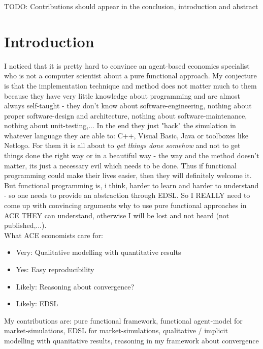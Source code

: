 \documentclass{article}
\begin{document}

TODO: Contributions should appear in the conclusion, introduction and abstract


\section{Introduction}

I noticed that it is pretty hard to convince an agent-based economics specialist who is not a computer scientist about a pure functional approach. My conjecture is that the implementation technique and method does not matter much to them because they have very little knowledge about programming and are almost always self-taught - they don't know about software-engineering, nothing about proper software-design and architecture, nothing about software-maintenance, nothing about unit-testing,... In the end they just "hack" the simulation in whatever language they are able to: C++, Visual Basic, Java or toolboxes like Netlogo. For them it is all about to \textit{get things done somehow} and not to get things done the right way or in a beautiful way - the way and the method doesn't matter, its just a necessary evil which needs to be done. Thus if functional programming could make their lives easier, then they will definitely welcome it. But functional programming is, i think, harder to learn and harder to understand - so one needs to provide an abstraction through EDSL. So I REALLY need to come up with convincing arguments why to use pure functional approaches in ACE THEY can understand, otherwise I will be lost and not heard (not published,...). \\

What ACE economists care for:

\begin{itemize}
\item Very: Qualitative modelling with quantitative results
\item Yes: Easy reproducibility
\item Likely: Reasoning about convergence?
\item Likely: EDSL
\end{itemize}

My contributions are: pure functional framework, functional agent-model for market-simulations, EDSL for market-simulations, qualitative / implicit modelling with quanitative results, reasoning in my framework about convergence \\
\end{document}
